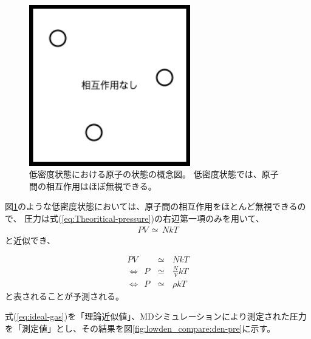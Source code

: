 \documentclass[titlepage]{jsreport}
\begin{document}
{{{\begin{figure}[htbp]
    \begin{center}
        \includegraphics[width=7cm]{fig/lowdensity.png}
    \end{center}
    \caption{低密度状態における原子の状態の概念図。
    低密度状態では、原子間の相互作用はほぼ無視できる。}
    \label{fig:lowdensity.png}
\end{figure}

図\ref{fig:lowdensity.png}のような低密度状態においては、原子間の相互作用をほとんど無視できるので、
圧力は式(\ref{eq:Theoritical-pressure})の右辺第一項のみを用いて、
\large
\begin{eqnarray}
PV\,{\simeq}\,NkT \nonumber
\end{eqnarray}
\normalsize
と近似でき、

\newpage
\large
\begin{eqnarray}
PV\,&{\simeq}&\,NkT\nonumber\\
{\Leftrightarrow}{\ }{\ }P\,&{\simeq}&\,{\frac{N}{V}}kT\nonumber\\
{\Leftrightarrow}{\ }{\ }P\,&{\simeq}&\,{\rho}kT \label{eq:ideal-gas}
\end{eqnarray}
\normalsize
と表されることが予測される。

式(\ref{eq:ideal-gas})を「理論近似値」、MDシミュレーションにより測定された圧力を「測定値」とし、その結果を図\ref{fig:lowden_compare:den-pre}に示す。

}}}
\end{document}
